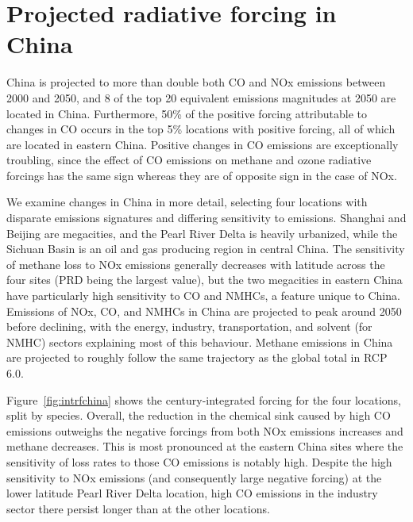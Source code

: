 \section{Projected radiative forcing in China}

China is projected to more than double both CO and NOx emissions between 2000 and 2050, and 8 of the top 20 equivalent emissions magnitudes at 2050 are located in China. Furthermore, 50\% of the positive forcing attributable to changes in CO occurs in the top 5\% locations with positive forcing, all of which are located in eastern China. Positive changes in CO emissions are exceptionally troubling, since the effect of CO emissions on methane and ozone radiative forcings has the same sign whereas they are of opposite sign in the case of NOx.

We examine changes in China in more detail, selecting four locations with disparate emissions signatures and differing sensitivity to emissions. Shanghai and Beijing are megacities, and the Pearl River Delta is heavily urbanized, while the Sichuan Basin is an oil and gas producing region in central China. The sensitivity of methane loss to NOx emissions generally decreases with latitude across the four sites (PRD being the largest value), but the two megacities in eastern China have particularly high sensitivity to CO and NMHCs, a feature unique to China. Emissions of NOx, CO, and NMHCs in China are projected to peak around 2050 before declining, with the energy, industry, transportation, and solvent (for NMHC) sectors explaining most of this behaviour. Methane emissions in China are projected to roughly follow the same trajectory as the global total in RCP 6.0.

Figure~\ref{fig:intrfchina} shows the century-integrated forcing for the four locations, split by species. Overall, the reduction in the chemical sink caused by high CO emissions outweighs the negative forcings from both NOx emissions increases and methane decreases. This is most pronounced at the eastern China sites where the sensitivity of loss rates to those CO emissions is notably high. Despite the high sensitivity to NOx emissions (and consequently large negative forcing) at the lower latitude Pearl River Delta location, high CO emissions in the industry sector there persist longer than at the other locations.